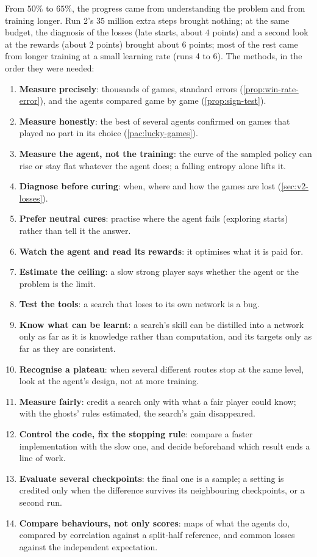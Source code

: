 From $50\%$ to $65\%$, the progress came from understanding the problem
and from training longer. Run 2's $35$ million extra steps brought
nothing; at the same budget, the diagnosis of the losses (late starts,
about $4$ points) and a second look at the rewards (about $2$ points)
brought about $6$ points; most of the rest came from longer training at a
small learning rate (runs 4 to 6). The methods, in the order they were needed:
\begin{enumerate}
  \item \textbf{Measure precisely}: thousands of games, standard errors
    (\cref{prop:win-rate-error}), and the agents compared game by game
    (\cref{prop:sign-test}).
  \item \textbf{Measure honestly}: the best of several agents confirmed on
    games that played no part in its choice (\cref{pac:lucky-games}).
  \item \textbf{Measure the agent, not the training}: the curve of the
    sampled policy can rise or stay flat whatever the agent does; a falling
    entropy alone lifts it.
  \item \textbf{Diagnose before curing}: when, where and how the games are
    lost (\cref{sec:v2-losses}).
  \item \textbf{Prefer neutral cures}: practise where the agent fails
    (exploring starts) rather than tell it the answer.
  \item \textbf{Watch the agent and read its rewards}: it optimises what it
    is paid for.
  \item \textbf{Estimate the ceiling}: a slow strong player says whether the
    agent or the problem is the limit.
  \item \textbf{Test the tools}: a search that loses to its own network is
    a bug.
  \item \textbf{Know what can be learnt}: a search's skill can be distilled
    into a network only as far as it is knowledge rather than computation,
    and its targets only as far as they are consistent.
  \item \textbf{Recognise a plateau}: when several different routes stop
    at the same level, look at the agent's design, not at more training.
  \item \textbf{Measure fairly}: credit a search only with what a fair
    player could know; with the ghosts' rules estimated, the search's gain
    disappeared.
  \item \textbf{Control the code, fix the stopping rule}: compare a faster
    implementation with the slow one, and decide beforehand which result
    ends a line of work.
  \item \textbf{Evaluate several checkpoints}: the final one is a sample;
    a setting is credited only when the difference survives its
    neighbouring checkpoints, or a second run.
  \item \textbf{Compare behaviours, not only scores}: maps of what the
    agents do, compared by correlation against a split-half reference, and
    common losses against the independent expectation.
\end{enumerate}
